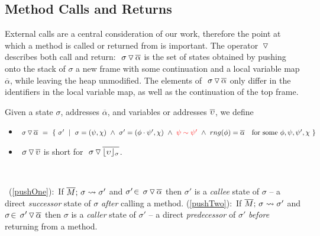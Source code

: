 {\subsection{Method Calls and Returns}


{External calls are a central consideration of our work, therefore  the point at which a method is called or returned from is important.
The operator $\, {\triangledown}\,$ describes both call and return:
 $  \ {\sigma} \, {\triangledown}\, \overline{\alpha}  $ is  the set of states obtained by pushing onto the stack of $\sigma$ a new frame with some continuation  and a local variable map  $\overline \alpha$, while leaving the heap unmodified.
The elements of $  \ {\sigma} \, {\triangledown}\, \overline{\alpha}  $ only differ in the identifiers in the local variable map, as well as the continuation  of the top frame. 
}

\begin{definition}
\label{def:push:frame}
Given a state $\sigma$, addresses $\overline \alpha$, and variables or addresses $\overline {\upsilon}$, we define
\begin{itemize}
\item
$ \PushS  {\alpha} {\sigma} \ =\ \{ \ \sigma' \ \mid\ \sigma=(\psi, \chi)\  \wedge\  \sigma'=(\phi\cdot \psi', \chi) \ \wedge\ \red{\psi\sim\psi'} \ \wedge\ rng(\phi)=\overline \alpha \ \ \mbox{ for some } \phi, \psi, \psi', \chi \ \}$
\item
{$  \ {\sigma} \, {\triangledown}\, \overline{\upsilon} $ is short for  $  \ {\sigma} \, {\triangledown}\, \overline{\lfloor \upsilon \rfloor_{\sigma}}  $.}
\end{itemize}
\\

\end{definition}

\  (\ref{pushOne}):\  If $\overline{M};\, \sigma \leadsto {\sigma'} $ and $\sigma'\!\in\! \ {\sigma} \, {\triangledown}\, \overline{\alpha} $ then $\sigma'$ is a  \emph{callee} state of $\sigma$ --  {a direct \emph{successor} state of    $\sigma$ \emph{after} calling a method}. %
 (\ref{pushTwo}):\  If $\overline{M};\, \sigma \leadsto {\sigma'} $ and $\sigma\! \in\!  \ {\sigma'} \, {\triangledown}\, \overline{\alpha} $  then $\sigma$ is a  \emph{caller} state  of $\sigma'$ -- {a direct \emph{predecessor} of $\sigma'$} \emph{before} returning from a method.
  
}

